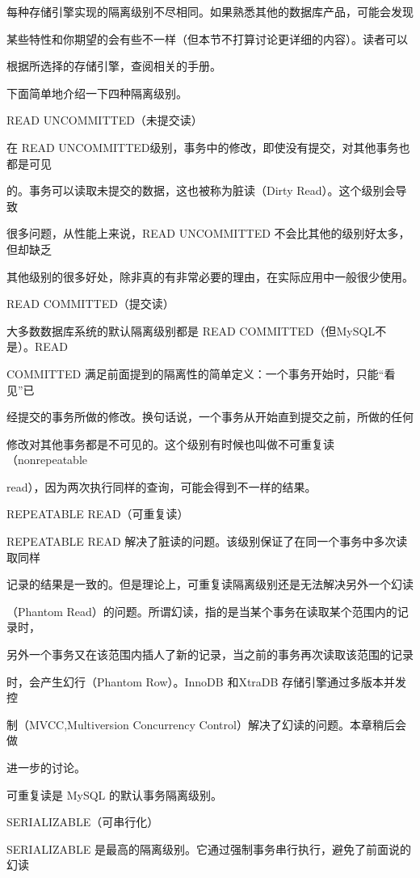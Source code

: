 每种存储引擎实现的隔离级别不尽相同。如果熟悉其他的数据库产品，可能会发现

某些特性和你期望的会有些不一样（但本节不打算讨论更详细的内容）。读者可以

根据所选择的存储引擎，查阅相关的手册。

下面简单地介绍一下四种隔离级别。

READ UNCOMMITTED（未提交读）

在 READ UNCOMMITTED级别，事务中的修改，即使没有提交，对其他事务也都是可见

的。事务可以读取未提交的数据，这也被称为脏读（Dirty Read）。这个级别会导致

很多问题，从性能上来说，READ UNCOMMITTED 不会比其他的级别好太多，但却缺乏

其他级别的很多好处，除非真的有非常必要的理由，在实际应用中一般很少使用。

READ COMMITTED（提交读）

大多数数据库系统的默认隔离级别都是 READ COMMITTED（但MySQL不是）。READ

COMMITTED 满足前面提到的隔离性的简单定义：一个事务开始时，只能“看见”已

经提交的事务所做的修改。换句话说，一个事务从开始直到提交之前，所做的任何

修改对其他事务都是不可见的。这个级别有时候也叫做不可重复读（nonrepeatable

read），因为两次执行同样的查询，可能会得到不一样的结果。

REPEATABLE READ（可重复读）

REPEATABLE READ 解决了脏读的问题。该级别保证了在同一个事务中多次读取同样

记录的结果是一致的。但是理论上，可重复读隔离级别还是无法解决另外一个幻读

（Phantom Read）的问题。所谓幻读，指的是当某个事务在读取某个范围内的记录时，

另外一个事务又在该范围内插人了新的记录，当之前的事务再次读取该范围的记录

时，会产生幻行（Phantom Row）。InnoDB 和XtraDB 存储引擎通过多版本并发控

制（MVCC,Multiversion Concurrency Control）解决了幻读的问题。本章稍后会做

进一步的讨论。

可重复读是 MySQL 的默认事务隔离级别。

SERIALIZABLE（可串行化）

SERIALIZABLE 是最高的隔离级别。它通过强制事务串行执行，避免了前面说的幻读

